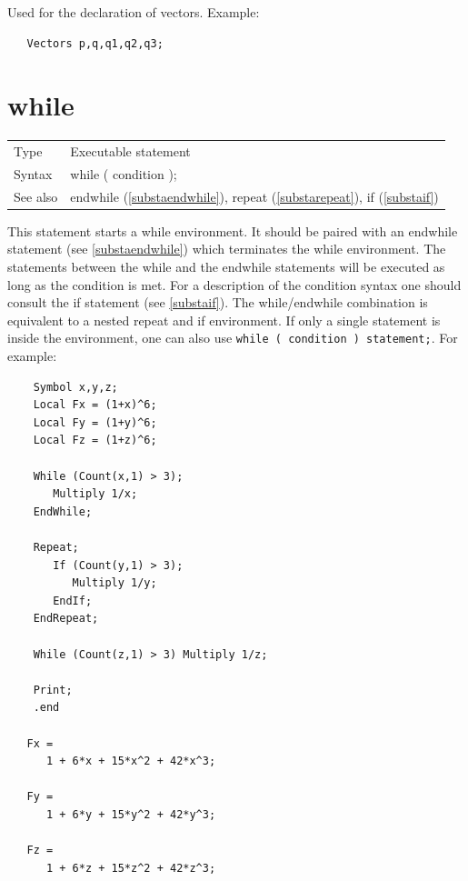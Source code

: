 \noindent Used for the declaration of vectors. Example:
\begin{verbatim}
   Vectors p,q,q1,q2,q3;
\end{verbatim}
\vspace{10mm}


\section{while}
\label{substawhile}

\noindent \begin{tabular}{ll}
Type & Executable statement\\
Syntax & while ( condition );
\\ See also & endwhile (\ref{substaendwhile}), repeat (\ref{substarepeat}),
            if (\ref{substaif})
\end{tabular} \vspace{4mm}

\noindent This statement starts a while 
environment. It should be paired with an 
endwhile statement (see \ref{substaendwhile}) which 
terminates the while environment. The statements between the while and the 
endwhile statements will be executed as long as the condition is met. For 
a description of the condition syntax one should consult the if 
statement (see \ref{substaif}). The while/endwhile combination is 
equivalent to a nested repeat and if environment.
If only a single statement is inside the environment, one can also use
{\tt while ( condition ) statement;}. For example:

\begin{verbatim}
    Symbol x,y,z;
    Local Fx = (1+x)^6;
    Local Fy = (1+y)^6;
    Local Fz = (1+z)^6;

    While (Count(x,1) > 3);
       Multiply 1/x;
    EndWhile;

    Repeat;
       If (Count(y,1) > 3);
          Multiply 1/y;
       EndIf;
    EndRepeat;

    While (Count(z,1) > 3) Multiply 1/z;

    Print;
    .end

   Fx =
      1 + 6*x + 15*x^2 + 42*x^3;

   Fy =
      1 + 6*y + 15*y^2 + 42*y^3;

   Fz =
      1 + 6*z + 15*z^2 + 42*z^3;
\end{verbatim}

